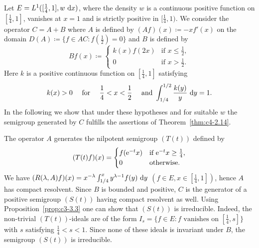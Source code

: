 \begin{example}\label{ex:c4-2.15}
Let $E = L^{1}([\frac{1}{4},1],w\,\mathop{}\!\mathrm{d}{x})$, where the density $w$ is a continuous positive function on $[\frac{1}{4},1]$, vanishes at $x = 1$ and is strictly positive in $[\frac{1}{4},1)$.
We consider the operator $C = A + B$ where $A$ is defined by $(Af)(x) \coloneq  -xf'(x)$ on the domain $D(A) \coloneq \{f \in AC \colon f(\frac{1}{2}) = 0\}$ and $B$ is defined by
\begin{equation*}\label{eq:c4-2.12-kgk}
Bf(x) \coloneq \begin{cases}
    k(x)f(2x) & \text{if } x \leq \frac{1}{2}, \\
    0 & \text{if } x > \frac{1}{2}.
\end{cases}
\end{equation*}
Here $k$ is a positive continuous function on $[\frac{1}{4},1]$ satisfying
\begin{equation}\label{eq:c4-2.13}
k(x) > 0 \quad \text{ for } \quad \frac{1}{4} < x < \frac{1}{2} \quad \text{ and }  \int_{1/4}^{1/2} \frac{k(y)}{y} \, \mathop{}\!\mathrm{d}{y} = 1.
\end{equation}
In the following we show that under these hypotheses and for suitable $w$ the semigroup generated by $C$ fulfills the assertions of Theorem~\ref{thm:c4-2.14}.

The operator $A$ generates the nilpotent semigroup $(T(t))$ defined by
\begin{equation*}\label{eq:c4-2.13-kgk}
(T(t)f)(x) = \begin{cases}
    f(\eu^{-t}x) & \text{if } \eu^{-t}x \geq \frac{1}{4}, \\
    0 & \text{otherwise}.
\end{cases}
\end{equation*}
We have $(R(\lambda,A)f)(x) = x^{-\lambda}\int_{1/4}^{x} y^{\lambda-1}f(y) \, \mathop{}\!\mathrm{d}{y}$ $(f \in E, x \in [\frac{1}{4},1])$, hence $A$ has compact resolvent.
Since $B$ is bounded and positive, $C$ is the generator of a positive semigroup $(S(t))$ having compact resolvent as well.
Using Proposition~\ref{prop:c3-3.3}  one can show that $(S(t))$ is irreducible.
Indeed, the non-trivial $(T(t))$-ideals are of the form $I_{s} = \{f \in E \colon f \text{ vanishes on } [\frac{1}{4},s]\}$ with $s$ satisfying $\frac{1}{4} < s < 1$.
Since none of these ideals is invariant under $B$, the semigroup $(S(t))$ is irreducible.


\end{example}
